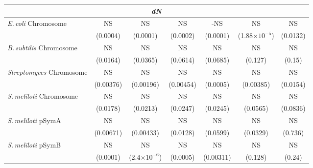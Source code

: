 \documentclass[11pt]{article}
\newcommand{\smel}{\textit{S.\,meliloti}\xspace}
\newcommand{\strep}{\textit{Streptomyces}\xspace}
\newcommand{\ecol}{\textit{E.\,coli}\xspace}
\newcommand{\bass}{\textit{B.\,subtilis}\xspace}
\newcommand{\pa}{pSymA\xspace}
\newcommand{\pb}{pSymB\xspace}
\newcommand{\dn}{\textit{dN}\xspace}
\providecommand{\e}[1]{\ensuremath{\times 10^{#1}}}
\begin{document}
\begin{table}[h]
{\begin{tabular}{lcccccc}
			
			\multicolumn{7}{c}{\textbf{\dn}} \\
			\midrule
			\ecol Chromosome & NS & NS & NS & -NS & NS & NS\\
			& (0.0004)& (0.0001) & (0.0002) & (0.0001) & (1.88\e{-5}) & (0.0132)\\
			\midrule
			\bass Chromosome & NS & NS & NS & NS & NS & NS\\
			& (0.0164) & (0.0365) & (0.0614) & (0.0685) & (0.127) & (0.15)\\
			\midrule
			\strep Chromosome &  NS & NS & NS & NS & NS & NS\\
			& (0.00376)& (0.00196) & (0.00454) & (0.0005) & (0.00385) & (0.0154)\\
			\midrule
			\smel Chromosome &  NS & NS & NS & NS & NS & NS\\
			& (0.0178) & (0.0213) & (0.0247) &(0.0245) & (0.0565) & (0.0836)\\
			\midrule
			\smel \pa &  NS & NS & NS & NS & NS & NS\\
			& (0.00671) & (0.00433) & (0.0128) & (0.0599) & (0.0329) & (0.736)\\
			\midrule
			\smel \pb &  NS & NS & NS & NS & NS & NS\\
			& (0.0001) & (2.4\e{-6}) & (0.0005) & (0.00311) & (0.128) & (0.24)\\
			\midrule
			

\end{tabular}}
\end{table}
\end{document}

